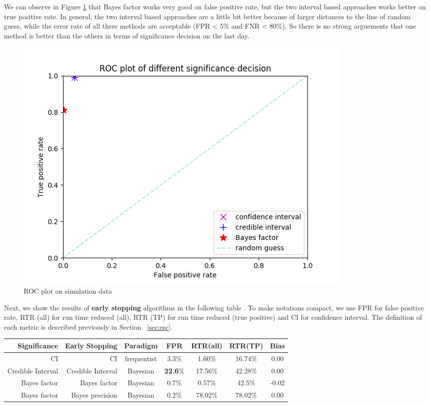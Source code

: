 \documentclass[paper=a4, fontsize=11pt]{scrartcl} %
\numberwithin{equation}{section} %
\numberwithin{figure}{section} %
\numberwithin{table}{section} %
\begin{document}
We can observe in Figure \ref{fig:roc_sim_data} that Bayes factor works very good on false positive rate, but the two interval based approaches works better on true positive rate. In general, the two interval based approaches are a little bit better because of larger distances to the line of random guess, while the error rate of all three methods are acceptable (FPR < 5\% and FNR < 80\%). So there is no strong arguements that one method is better than the others in terms of significance decision on the last day.

\begin{figure} 
\centering
\includegraphics[scale=.6]{roc_sim_data.png}
\caption{ROC plot on simulation data}
\label{fig:roc_sim_data}
\end{figure}

Next, we show the results of \textbf{early stopping} algorithms in the following table . To make notations compact, we use FPR for false positive rate, RTR (all) for run time reduced (all), RTR (TP) for run time reduced (true positive) and CI for confidence interval. The definition of each metric is described previously in Section ~\ref{sec:esc}.

\begin{center}
  \begin{tabular}{ | r | r | c | c | c | c | c | }
    \hline
    \textbf{Significance} & \textbf{Early Stopping}  & \textbf{Paradigm} & \textbf{FPR} & \textbf{RTR(all)} & \textbf{RTR(TP)} & \textbf{Bias} \\ \hline\hline
    CI &  CI & frequentist & 3.3\% &  1.60\% & 16.74\% & 0.00 \\ \hline
    Credible Interval & Credible Interval & Bayesian & \textbf{22.6}\% & 17.56\% &  42.28\% & 0.00 \\ \hline
    Bayes factor & Bayes factor & Bayesian & 0.7\% & 0.57\% & 42.5\% & -0.02 \\ \hline
    Bayes factor & Bayes precision & Bayesian & 0.2\% & 78.02\% &  78.02\% &  0.00 \\ \hline
  \end{tabular}
\end{center}
\end{document}
